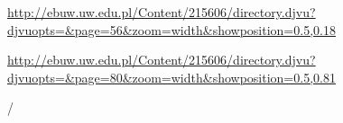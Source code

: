 
\newParkoszpage

{
\url{http://ebuw.uw.edu.pl/Content/215606/directory.djvu?djvuopts=&page=56&zoom=width&showposition=0.5,0.18}

\url{http://ebuw.uw.edu.pl/Content/215606/directory.djvu?djvuopts=&page=80&zoom=width&showposition=0.5,0.81}
}

\bigskip

\obeylines
\mono

\fulllines









\splitlines

\def\firstsubline#1{\settowidth{\indentVt}{#1}#1}
\def\nextsubline#1{\indentVerseTotal\settowidth{\indentV}{#1}\addtolength{\indentVt}{\indentV}#1}

{    }

{  }

\splitlines

\indentVerse {} 

  

  /

\indentVerse {}

\splitlines

\indentVerse {}

  

  

\splitlines

   

 

\splitlines

